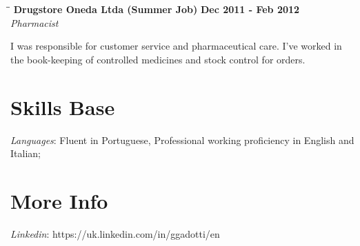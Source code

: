 \documentclass[margin]{res}
\begin{document}
\begin{resume}
\vspace{-0.1in}
   \begin{tabbing}
   \hspace{2.3in}\= \hspace{1.7in}\= \kill %
    \textbf{Drugstore Oneda Ltda (Summer Job)}    \>\>\textbf{Dec 2011 - Feb 2012}\\
    \textit{Pharmacist}\\   
   \end{tabbing}\vspace{-20pt}      %
I was responsible for customer service and pharmaceutical care. I’ve worked in the book-keeping of controlled
medicines and stock control for orders.

\section{Skills Base}
			\textit{Languages}: Fluent in Portuguese, Professional working proficiency in English and Italian;
 
\section{More Info}
      \textit{Linkedin}: https://uk.linkedin.com/in/ggadotti/en

\end{resume}
\center{\LaTeX}
\end{document}
